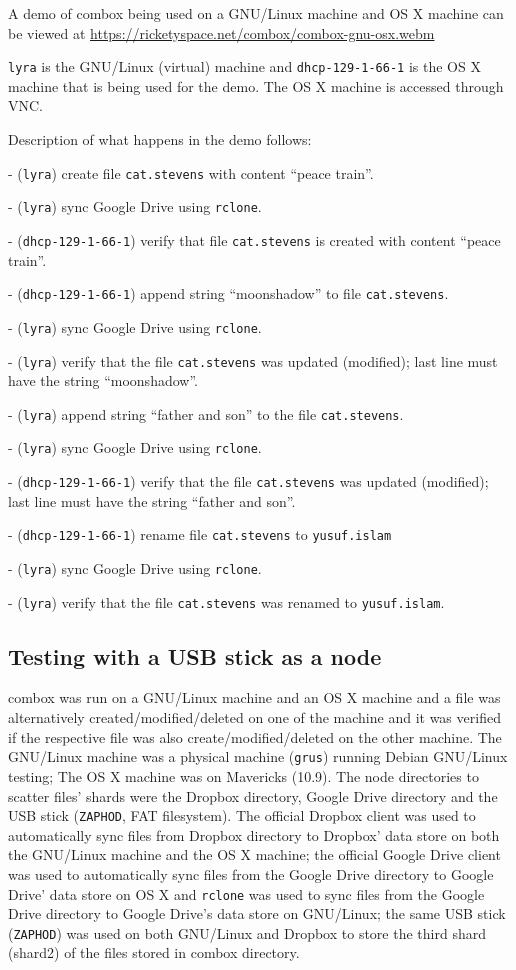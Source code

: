 A demo of combox being used on a GNU/Linux machine and OS X machine
can be viewed at
\url{https://ricketyspace.net/combox/combox-gnu-osx.webm}

\verb+lyra+ is the GNU/Linux (virtual) machine and
\verb+dhcp-129-1-66-1+ is the OS X machine that is being used for the
demo. The OS X machine is accessed through VNC\cite{article:vnc}.

Description of what happens in the demo follows:

- (\verb+lyra+) create file \verb+cat.stevens+ with content ``peace
train''.

- (\verb+lyra+) sync Google Drive using \verb+rclone+.

- (\verb+dhcp-129-1-66-1+) verify that file \verb+cat.stevens+ is
created with content ``peace train''.

- (\verb+dhcp-129-1-66-1+) append string ``moonshadow'' to file
\verb+cat.stevens+.

- (\verb+lyra+) sync Google Drive using \verb+rclone+.

- (\verb+lyra+) verify that the file \verb+cat.stevens+ was updated
(modified); last line must have the string ``moonshadow''.

- (\verb+lyra+) append string ``father and son'' to the file
\verb+cat.stevens+.

- (\verb+lyra+) sync Google Drive using \verb+rclone+.

- (\verb+dhcp-129-1-66-1+) verify that the file \verb+cat.stevens+ was
updated (modified); last line must have the string ``father and son''.

- (\verb+dhcp-129-1-66-1+) rename file \verb+cat.stevens+ to
\verb+yusuf.islam+

- (\verb+lyra+) sync Google Drive using \verb+rclone+.

- (\verb+lyra+) verify that the file \verb+cat.stevens+ was renamed to
\verb+yusuf.islam+.

\subsection{Testing with a USB stick as a node}

combox was run on a GNU/Linux machine and an OS X machine and a file
was alternatively created/modified/deleted on one of the machine and
it was verified if the respective file was also
create/modified/deleted on the other machine. The GNU/Linux machine
was a physical machine (\verb+grus+) running Debian GNU/Linux testing;
The OS X machine was on Mavericks (10.9). The node directories to
scatter files' shards were the Dropbox directory, Google Drive
directory and the USB stick (\verb+ZAPHOD+, FAT filesystem). The
official Dropbox client was used to automatically sync files from
Dropbox directory to Dropbox' data store on both the GNU/Linux machine
and the OS X machine; the official Google Drive client was used to
automatically sync files from the Google Drive directory to Google
Drive' data store on OS X and \verb+rclone+\cite{program:rclone} was
used to sync files from the Google Drive directory to Google Drive's
data store on GNU/Linux; the same USB stick (\verb+ZAPHOD+) was used
on both GNU/Linux and Dropbox to store the third shard (shard2) of the
files stored in combox directory.

